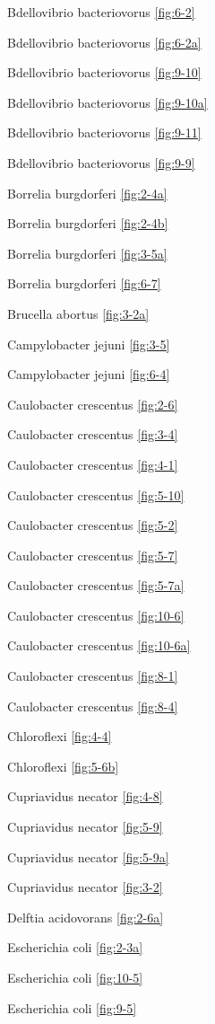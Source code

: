 \documentclass[]{tufte-book}
\begin{document}
Bdellovibrio bacteriovorus \ref{fig:6-2}

Bdellovibrio bacteriovorus \ref{fig:6-2a}

Bdellovibrio bacteriovorus \ref{fig:9-10}

Bdellovibrio bacteriovorus \ref{fig:9-10a}

Bdellovibrio bacteriovorus \ref{fig:9-11}

Bdellovibrio bacteriovorus \ref{fig:9-9}

Borrelia burgdorferi \ref{fig:2-4a}

Borrelia burgdorferi \ref{fig:2-4b}

Borrelia burgdorferi \ref{fig:3-5a}

Borrelia burgdorferi \ref{fig:6-7}

Brucella abortus \ref{fig:3-2a}

Campylobacter jejuni \ref{fig:3-5}

Campylobacter jejuni \ref{fig:6-4}

Caulobacter crescentus \ref{fig:2-6}

Caulobacter crescentus \ref{fig:3-4}

Caulobacter crescentus \ref{fig:4-1}

Caulobacter crescentus \ref{fig:5-10}

Caulobacter crescentus \ref{fig:5-2}

Caulobacter crescentus \ref{fig:5-7}

Caulobacter crescentus \ref{fig:5-7a}

Caulobacter crescentus \ref{fig:10-6}

Caulobacter crescentus \ref{fig:10-6a}

Caulobacter crescentus \ref{fig:8-1}

Caulobacter crescentus \ref{fig:8-4}

Chloroflexi \ref{fig:4-4}

Chloroflexi \ref{fig:5-6b}

Cupriavidus necator \ref{fig:4-8}

Cupriavidus necator \ref{fig:5-9}

Cupriavidus necator \ref{fig:5-9a}

Cupriavidus necator \ref{fig:3-2}

Delftia acidovorans \ref{fig:2-6a}

Escherichia coli \ref{fig:2-3a}

Escherichia coli \ref{fig:10-5}

Escherichia coli \ref{fig:9-5}
\end{document}
